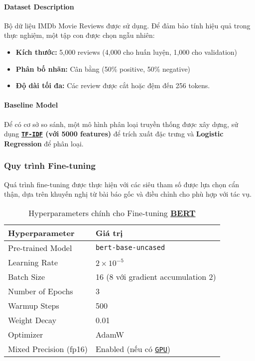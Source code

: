 \paragraph{Dataset Description}
Bộ dữ liệu IMDb Movie Reviews \cite{maas2011learning} được sử dụng. Để đảm bảo tính hiệu quả trong thực nghiệm, một tập con được chọn ngẫu nhiên:
\begin{itemize}
    \item \textbf{Kích thước:} 5,000 reviews (4,000 cho huấn luyện, 1,000 cho validation)
    \item \textbf{Phân bố nhãn:} Cân bằng (50\% positive, 50\% negative)  
    \item \textbf{Độ dài tối đa:} Các review được cắt hoặc đệm đến 256 tokens.
\end{itemize}

\paragraph{Baseline Model}
Để có cơ sở so sánh, một mô hình phân loại truyền thống được xây dựng, sử dụng \textbf{\hyperref[acro:tfidf]{\texttt{TF-IDF}} (với 5000 features)} để trích xuất đặc trưng và \textbf{Logistic Regression} để phân loại.

\subsubsection{Quy trình Fine-tuning}
Quá trình fine-tuning được thực hiện với các siêu tham số được lựa chọn cẩn thận, dựa trên khuyến nghị từ bài báo gốc và điều chỉnh cho phù hợp với tác vụ.

\begin{table}[H]
\centering
\caption{Hyperparameters chính cho Fine-tuning \hyperref[acro:bert]{\textbf{BERT}}}
\label{tab:finetuning_params_app}
\begin{tabular}{ll}
\toprule
\textbf{Hyperparameter} & \textbf{Giá trị} \\
\midrule
Pre-trained Model & \texttt{bert-base-uncased} \\
Learning Rate & $2 \times 10^{-5}$ \\
Batch Size & 16 (8 với gradient accumulation 2) \\
Number of Epochs & 3 \\
Warmup Steps & 500 \\
Weight Decay & 0.01 \\
Optimizer & AdamW \\
Mixed Precision (fp16) & Enabled (nếu có \hyperref[acro:gpu]{\texttt{GPU}}) \\
\bottomrule
\end{tabular}
\end{table}

